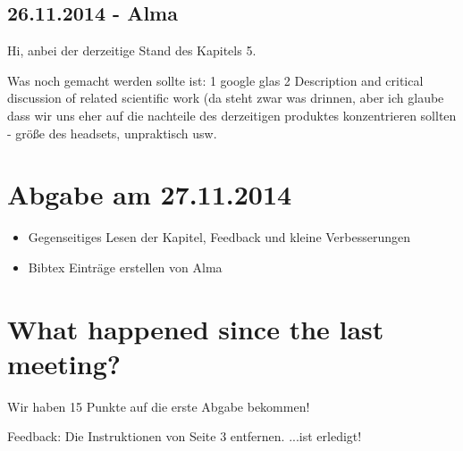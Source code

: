 \documentclass[a4paper,11pt]{article}
\begin{document}
\subsection{26.11.2014 - Alma}
Hi,
 anbei der derzeitige Stand des Kapitels 5.

Was noch gemacht werden sollte ist:
1 google glas
2 Description and critical discussion of related scientific work (da steht zwar was drinnen, aber ich glaube dass wir uns eher auf die nachteile des derzeitigen produktes konzentrieren sollten - größe des headsets, unpraktisch usw.

\section{Abgabe am 27.11.2014}
\begin{itemize}
  \item Gegenseitiges Lesen der Kapitel, Feedback und kleine Verbesserungen
  \item Bibtex Einträge erstellen von Alma
\end{itemize}

\section{What happened since the last meeting?}
Wir haben 15 Punkte auf die erste Abgabe bekommen!

Feedback: Die Instruktionen von Seite 3 entfernen. ...ist erledigt!
\end{document}
